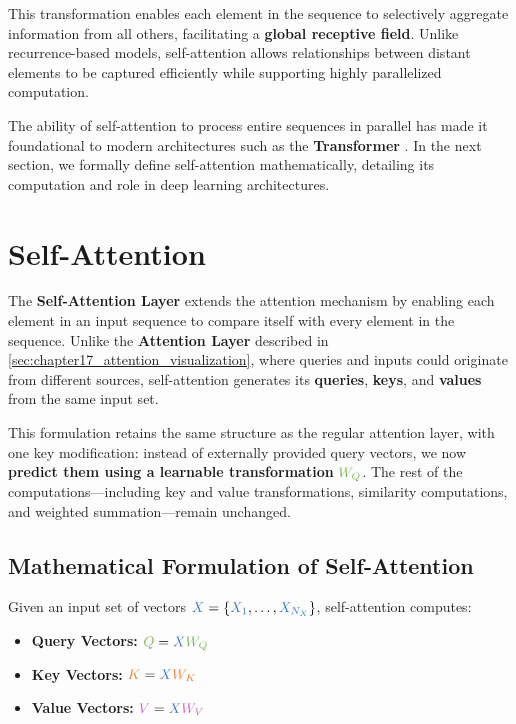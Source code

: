 \noindent This transformation enables each element in the sequence to selectively aggregate information from all others, facilitating a \textbf{global receptive field}. Unlike recurrence-based models, self-attention allows relationships between distant elements to be captured efficiently while supporting highly parallelized computation. 

\noindent The ability of self-attention to process entire sequences in parallel has made it foundational to modern architectures such as the \textbf{Transformer} \cite{vaswani2017_attention}. In the next section, we formally define self-attention mathematically, detailing its computation and role in deep learning architectures.

\section{Self-Attention}
\label{sec:chapter17_self_attention}

\noindent The \textbf{Self-Attention Layer} extends the attention mechanism by enabling each element in an input sequence to compare itself with every element in the sequence. Unlike the \textbf{Attention Layer} described in \autoref{sec:chapter17_attention_visualization}, where queries and inputs could originate from different sources, self-attention generates its \textbf{queries}, \textbf{keys}, and \textbf{values} from the same input set. 

\noindent This formulation retains the same structure as the regular attention layer, with one key modification: instead of externally provided query vectors, we now \textbf{predict them using a learnable transformation} \( \textcolor[rgb]{0.471,0.694,0.318}{W_Q} \). The rest of the computations—including key and value transformations, similarity computations, and weighted summation—remain unchanged.

\subsection{Mathematical Formulation of Self-Attention}

\noindent Given an input set of vectors \( \textcolor[rgb]{0.267,0.447,0.769}{X} = \{\textcolor[rgb]{0.267,0.447,0.769}{X_1}, \dots, \textcolor[rgb]{0.267,0.447,0.769}{X_{N_X}}\} \), self-attention computes:

\begin{itemize}
    \item \textbf{Query Vectors:} \( \textcolor[rgb]{0.471,0.694,0.318}{Q} = \textcolor[rgb]{0.267,0.447,0.769}{X} \textcolor[rgb]{0.471,0.694,0.318}{W_Q} \)
    \item \textbf{Key Vectors:} \( \textcolor[rgb]{0.929,0.502,0.212}{K} = \textcolor[rgb]{0.267,0.447,0.769}{X} \textcolor[rgb]{0.929,0.502,0.212}{W_K} \)
    \item \textbf{Value Vectors:} \( \textcolor[rgb]{0.769,0.369,0.800}{V} = \textcolor[rgb]{0.267,0.447,0.769}{X} \textcolor[rgb]{0.769,0.369,0.800}{W_V} \)
\end{itemize}

